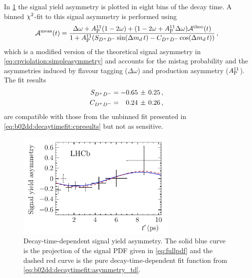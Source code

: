 In \cref{fig:b02dd:decaytimefit:asymmetry} the signal yield asymmetry is
plotted in eight bins of the decay time. A binned $\chi^2$-fit to this signal
asymmetry is performed using
\begin{align}
{\mathcal A}^{\text{meas}}(t) = \frac{\Delta\omega + A_\text{P}^{11}(1 - 2\omega) + (1 - 2\omega + A_\text{P}^{11}\Delta\omega){\mathcal A}^{\text{theo}}(t)}{1 + A_\text{P}^{11}(S_{{{D}^+}{{D}^-}} \sin({\Delta m_{{d}}}\,t) - C_{{{D}^+}{{D}^-}} \cos({\Delta m_{{d}}}\,t))}\,,
\label{eq:b02dd:decaytimefit:asymmetry_td}
\end{align}
which is a modified version of the theoretical signal asymmetry in
\cref{eq:cpviolation:simpleasymmetry} and accounts for the mistag probability
\mistag and the asymmetries induced by flavour tagging ($\Delta\omega$) and
production asymmetry ($A_\text{P}^{11}$). The fit results
\begin{align*}
\begin{split}
  S_{{{D}^+}{{D}^-}}                &= -0.65\,\pm\,0.25 \,, \\
  C_{{{D}^+}{{D}^-}}                &= \phantom{-}0.24\,\pm\,0.26 \,,
\end{split}
\end{align*}
are compatible with those from the unbinned fit presented in
\cref{eq:b02dd:decaytimefit:cpresults} but not as sensitive.
\begin{figure}[htb]
\centering
\includegraphics[width=0.7\textwidth]{07-B02DD/tikz/pdf/Asymmetry.pdf}
\caption{Decay-time-dependent signal yield asymmetry. The solid blue curve is the
projection of the signal PDF given in \cref{eq:fullpdf} and the dashed red
curve is the pure decay-time-dependent fit function from
\cref{eq:b02dd:decaytimefit:asymmetry_td}.}
\label{fig:b02dd:decaytimefit:asymmetry}
\end{figure}

\FloatBarrier
